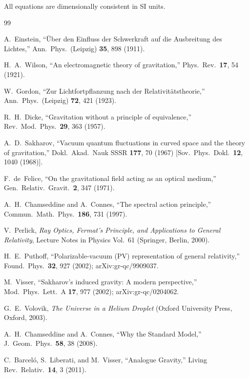 \documentclass[aps,prd,twocolumn,superscriptaddress,nofootinbib]{revtex4-2}
\begin{document}
All equations are dimensionally consistent in SI units.


\begin{thebibliography}{99}

A.~Einstein,
``\"{U}ber den Einfluss der Schwerkraft auf die Ausbreitung des Lichtes,''
Ann.\ Phys.\ (Leipzig) \textbf{35}, 898 (1911).

H.~A.~Wilson,
``An electromagnetic theory of gravitation,''
Phys.\ Rev.\ \textbf{17}, 54 (1921).

W.~Gordon,
``Zur Lichtfortpflanzung nach der Relativit\"{a}tstheorie,''
Ann.\ Phys.\ (Leipzig) \textbf{72}, 421 (1923).

R.~H.~Dicke,
``Gravitation without a principle of equivalence,''
Rev.\ Mod.\ Phys.\ \textbf{29}, 363 (1957).

A.~D.~Sakharov,
``Vacuum quantum fluctuations in curved space and the theory of
gravitation,''
Dokl.\ Akad.\ Nauk SSSR \textbf{177}, 70 (1967)
[Sov.\ Phys.\ Dokl.\ \textbf{12}, 1040 (1968)].

F.~de~Felice,
``On the gravitational field acting as an optical medium,''
Gen.\ Relativ.\ Gravit.\ \textbf{2}, 347 (1971).

A.~H.~Chamseddine and A.~Connes,
``The spectral action principle,''
Commun.\ Math.\ Phys.\ \textbf{186}, 731 (1997).

V.~Perlick,
\emph{Ray Optics, Fermat's Principle, and Applications to General
Relativity},
Lecture Notes in Physics Vol.~61 (Springer, Berlin, 2000).

H.~E.~Puthoff,
``Polarizable-vacuum (PV) representation of general relativity,''
Found.\ Phys.\ \textbf{32}, 927 (2002);
arXiv:gr-qc/9909037.

M.~Visser,
``Sakharov's induced gravity: A modern perspective,''
Mod.\ Phys.\ Lett.\ A \textbf{17}, 977 (2002);
arXiv:gr-qc/0204062.

G.~E.~Volovik,
\emph{The Universe in a Helium Droplet}
(Oxford University Press, Oxford, 2003).

A.~H.~Chamseddine and A.~Connes,
``Why the Standard Model,''
J.\ Geom.\ Phys.\ \textbf{58}, 38 (2008).

C.~Barcel\'{o}, S.~Liberati, and M.~Visser,
``Analogue Gravity,''
Living Rev.\ Relativ.\ \textbf{14}, 3 (2011).


\end{thebibliography}
\end{document}
